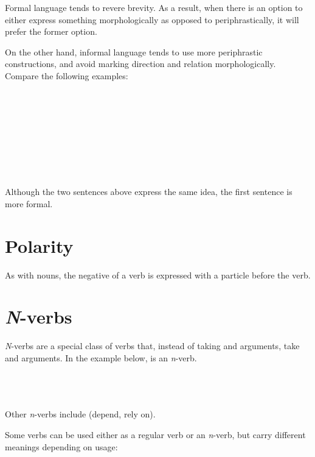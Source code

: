 \documentclass{book}
\begin{document}
Formal language tends to revere brevity. As a result, when there is an option to either express something morphologically as opposed to periphrastically, it will prefer the former option.

On the other hand, informal language tends to use more periphrastic constructions, and avoid marking direction and relation morphologically. Compare the following examples: \\
~\\
 \\
 \\
~\\
   \\
   \\
\emph{   } \\
~

Although the two sentences above express the same idea, the first sentence is more formal.

\section{Polarity}

As with nouns, the negative of a verb is expressed with a particle  before the verb.

\section{\emph{N}-verbs}

\emph{N}-verbs are a special class of verbs that, instead of taking  and  arguments, take  and  arguments. In the example below,  is an \emph{n}-verb. \\
~\\
    \\
    \\
\emph{   }

Other \emph{n}-verbs include  (depend, rely on).

Some verbs can be used either as a regular verb or an \emph{n}-verb, but carry different meanings depending on usage:
\end{document}

